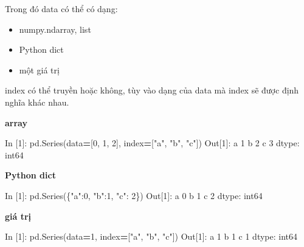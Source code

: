 \documentclass[
]{book}
\newenvironment{Shaded}{\begin{snugshade}}{\end{snugshade}}
\newcommand{\DecValTok}[1]{\textcolor[rgb]{0.00,0.00,0.81}{#1}}
\newcommand{\NormalTok}[1]{#1}
\newcommand{\OperatorTok}[1]{\textcolor[rgb]{0.81,0.36,0.00}{\textbf{#1}}}
\newcommand{\StringTok}[1]{\textcolor[rgb]{0.31,0.60,0.02}{#1}}
\begin{document}
Trong đó data có thể có dạng:

\begin{itemize}
\item
  numpy.ndarray, list
\item
  Python dict
\item
  một giá trị
\end{itemize}

index có thể truyền hoặc không, tùy vào dạng của data mà index sẽ được định nghĩa khác nhau.

\textbf{array}

\begin{Shaded}
\begin{Highlighting}[]
\NormalTok{In [}\DecValTok{1}\NormalTok{]: pd.Series(data}\OperatorTok{=}\NormalTok{[}\DecValTok{0}\NormalTok{, }\DecValTok{1}\NormalTok{, }\DecValTok{2}\NormalTok{], index}\OperatorTok{=}\NormalTok{[}\StringTok{"a"}\NormalTok{, }\StringTok{"b"}\NormalTok{, }\StringTok{"c"}\NormalTok{])}
\NormalTok{Out[}\DecValTok{1}\NormalTok{]: }
\NormalTok{a   }\DecValTok{1}
\NormalTok{b   }\DecValTok{2}
\NormalTok{c   }\DecValTok{3}
\NormalTok{dtype: int64}
\end{Highlighting}
\end{Shaded}

\textbf{Python dict}

\begin{Shaded}
\begin{Highlighting}[]
\NormalTok{In [}\DecValTok{1}\NormalTok{]: pd.Series(\{}\StringTok{"a"}\NormalTok{:}\DecValTok{0}\NormalTok{, }\StringTok{"b"}\NormalTok{:}\DecValTok{1}\NormalTok{, }\StringTok{"c"}\NormalTok{: }\DecValTok{2}\NormalTok{\})}
\NormalTok{Out[}\DecValTok{1}\NormalTok{]: }
\NormalTok{a    }\DecValTok{0}
\NormalTok{b    }\DecValTok{1}
\NormalTok{c    }\DecValTok{2}
\NormalTok{dtype: int64}
\end{Highlighting}
\end{Shaded}

\textbf{giá trị}

\begin{Shaded}
\begin{Highlighting}[]
\NormalTok{In [}\DecValTok{1}\NormalTok{]: pd.Series(data}\OperatorTok{=}\DecValTok{1}\NormalTok{, index}\OperatorTok{=}\NormalTok{[}\StringTok{"a"}\NormalTok{, }\StringTok{"b"}\NormalTok{, }\StringTok{"c"}\NormalTok{])}
\NormalTok{Out[}\DecValTok{1}\NormalTok{]: }
\NormalTok{a    }\DecValTok{1}
\NormalTok{b    }\DecValTok{1}
\NormalTok{c    }\DecValTok{1}
\NormalTok{dtype: int64}
\end{Highlighting}
\end{Shaded}
\end{document}
